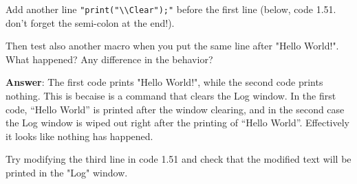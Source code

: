 \begin{indentexercise}{1}
\item Add another line \texttt{"print("\textbackslash{}\textbackslash{}Clear");"} 
before the first line (below, code 1.51. don't forget the semi-colon at the end!). 
\item 
Then test also another macro when you put the same line after "Hello World!". 
What happened? Any difference in the behavior? 
\item 
\item \textbf{Answer}: The first code prints "Hello World!", while the second code prints nothing. This is becaise  is a command that clears the Log window. In the first code, ``Hello World'' is printed after the window clearing, and in the second case the Log window is wiped out right after the printing of ``Hello World''. Effectively it looks like nothing has happened.  
\end{indentexercise}

\begin{indentexercise}{2}
\item Try modifying the third line in code 1.51
and check that the modified text will be printed in the "Log" window. \\
\end{indentexercise}

